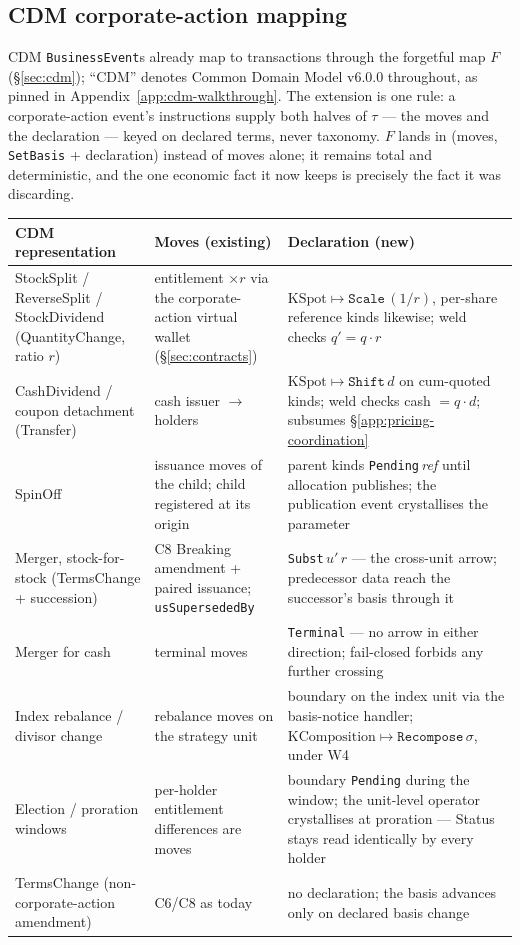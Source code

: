 \documentclass[11pt,a4paper]{article}
\begin{document}
\subsection{CDM corporate-action mapping}
\label{sec:basis-cdm}

CDM \texttt{BusinessEvent}s already map to transactions through the forgetful map $F$
(\S\ref{sec:cdm}); ``CDM'' denotes Common Domain Model v6.0.0 throughout, as pinned in
Appendix~\ref{app:cdm-walkthrough}. The extension is one rule: a corporate-action event's
instructions supply both halves of $\tau$ --- the moves and the declaration --- keyed on
declared terms, never taxonomy. $F$ lands in (moves, \texttt{SetBasis} + declaration)
instead of moves alone; it remains total and deterministic, and the one economic fact it
now keeps is precisely the fact it was discarding.

\renewcommand{\arraystretch}{1.25}
\begin{center}
\begin{longtable}{@{}p{4.4cm} p{4.2cm} p{4.8cm}@{}}
\toprule
\textbf{CDM representation} & \textbf{Moves (existing)} & \textbf{Declaration (new)} \\
\midrule
\endhead
StockSplit / ReverseSplit / StockDividend (QuantityChange, ratio $r$) & entitlement
$\times r$ via the corporate-action virtual wallet (\S\ref{sec:contracts}) &
$\mathrm{KSpot}\mapsto\texttt{Scale}\,(1/r)$, per-share reference kinds likewise; weld
checks $q'=q\cdot r$ \\
\addlinespace
CashDividend / coupon detachment (Transfer) & cash issuer $\to$ holders &
$\mathrm{KSpot}\mapsto\texttt{Shift}\,d$ on cum-quoted kinds; weld checks cash
$=q\cdot d$; subsumes \S\ref{app:pricing-coordination} \\
\addlinespace
SpinOff & issuance moves of the child; child registered at its origin & parent kinds
\texttt{Pending}\,\textit{ref} until allocation publishes; the publication event
crystallises the parameter \\
\addlinespace
Merger, stock-for-stock (TermsChange + succession) & C8 Breaking amendment + paired
issuance; \texttt{usSupersededBy} & \texttt{Subst}\,$u'\,r$ --- the cross-unit arrow;
predecessor data reach the successor's basis through it \\
\addlinespace
Merger for cash & terminal moves & \texttt{Terminal} --- no arrow in either direction;
fail-closed forbids any further crossing \\
\addlinespace
Index rebalance / divisor change & rebalance moves on the strategy unit & boundary on
the index unit via the basis-notice handler;
$\mathrm{KComposition}\mapsto\texttt{Recompose}\,\sigma$, under W4 \\
\addlinespace
Election / proration windows & per-holder entitlement differences are moves & boundary
\texttt{Pending} during the window; the unit-level operator crystallises at proration
--- Status stays read identically by every holder \\
\addlinespace
TermsChange (non-corporate-action amendment) & C6/C8 as today & no declaration; the
basis advances only on declared basis change \\
\bottomrule
\end{longtable}
\end{center}
\end{document}
